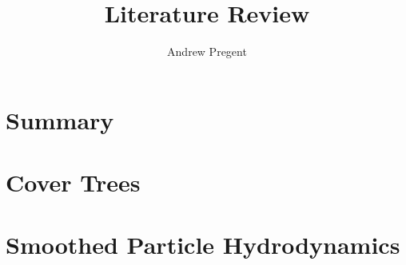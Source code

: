 \documentclass{article}
\title{Literature Review}
\author{Andrew Pregent}
\date{}
\begin{document}
\maketitle
\begin{multicols}{2}
\section*{Summary}

\section*{Cover Trees}

\section*{Smoothed Particle Hydrodynamics}
\end{multicols}
\end{document}
